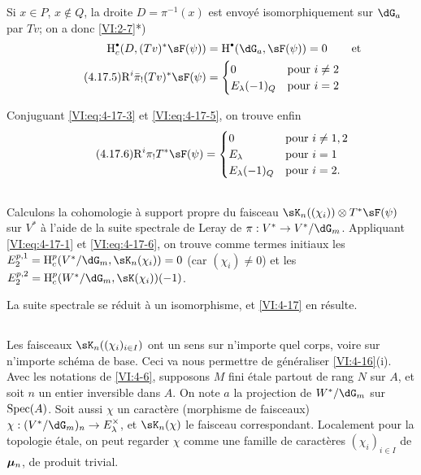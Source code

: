 Si $x\in P$, $x\notin Q$, la droite $D=\pi^{-1}(x)$ est envoyé 
isomorphiquement sur $\dG_a$ par $T v$; on a donc 
\ref{VI:2-7}*) 
\begin{align} \notag 
  \h_c^\bullet(D,(T v)^\ast \sF(\psi)) &= \h^\bullet(\dG_a,\sF(\psi)) = 0 && \text{et} \\
  \tag{4.17.5}\label{VI:eq:4-17-5}
  \eR^i \bar\pi_! (T v)^\ast \sF(\psi) 
    &= \begin{cases} 
         0 & \text{pour $i\ne 2$} \\
         E_\lambda(-1)_Q & \text{pour $i=2$} 
       \end{cases} 
\end{align}

Conjuguant \eqref{VI:eq:4-17-3} et \eqref{VI:eq:4-17-5}, on trouve enfin 
\begin{equation*}\tag{4.17.6}\label{VI:eq:4-17-6}
  \eR^i \pi_! T^\ast\sF(\psi) = 
    \begin{cases}
      0 & \text{pour $i\ne 1,2$} \\
      E_\lambda & \text{pour $i=1$} \\
      E_\lambda(-1)_Q & \text{pour $i=2$.} 
    \end{cases}
\end{equation*}





\subsection{}\label{VI:4-18}

Calculons la cohomologie à support propre du faisceau 
$\sK_n((\chi_i))\otimes T^\ast \sF(\psi)$ sur $V^\ast$ à l'aide de la suite 
spectrale de Leray de $\pi:V^\ast\to V^\ast/\dG_m$. Appliquant 
\eqref{VI:eq:4-17-1} et \eqref{VI:eq:4-17-6}, on trouve comme termes initiaux 
les $E_2^{p,1} = \h_c^p(V^\ast/\dG_m,\sK_n(\chi_i)) = 0$ (car $(\chi_i)\ne 0$) 
et les $E_2^{p,2} = \h_c^p(W^\ast/\dG_m,\sK(\chi_i))(-1)$. 

La suite spectrale se réduit à un isomorphisme, et \ref{VI:4-17} en 
résulte. 





\subsection{}\label{VI:4-19}

Les faisceaux $\sK_n((\chi_i)_{i\in I})$ ont un sens sur n'importe quel corps, 
voire sur n'importe schéma de base. Ceci va nous permettre de généraliser 
\ref{VI:4-16}(i). Avec les notations de \ref{VI:4-6}, supposons $M$ fini 
étale partout de rang $N$ sur $A$, et soit $n$ un entier inversible dans $A$. 
On note $a$ la projection de $W^\ast/\dG_m$ sur $\operatorname{Spec}(A)$. Soit aussi $\chi$ 
un caractère (morphisme de faisceaux) 
$\chi:(V^\ast/\dG_m)_n \to E_\lambda^\times$, et $\sK_n(\chi)$ le faisceau 
correspondant. Localement pour la topologie étale, on peut regarder $\chi$ 
comme une famille de caractères $(\chi_i)_{i\in I}$ de ${\bm\mu}_n$, de produit 
trivial. 





